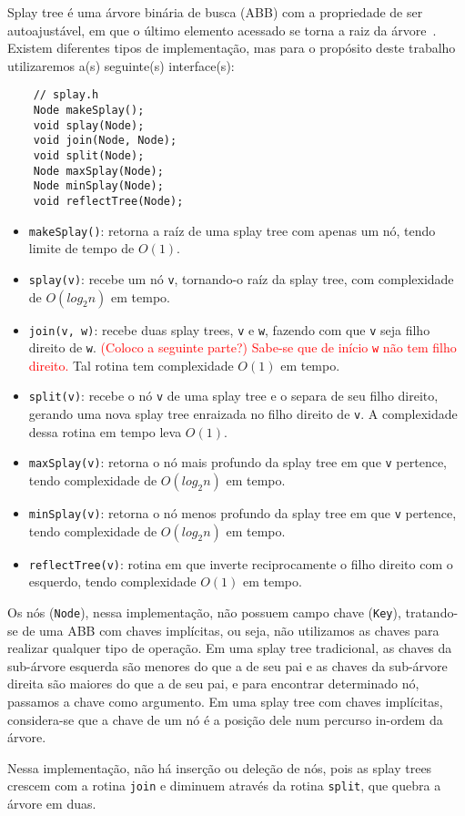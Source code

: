 Splay tree é uma árvore binária de busca (ABB) com a propriedade de ser autoajustável, em que o último elemento acessado se torna a raiz da árvore~\cite{SleatorT1985}. Existem diferentes tipos de implementação, mas para o propósito deste trabalho utilizaremos a(s) seguinte(s) interface(s):  

\begin{verbatim}
    // splay.h
    Node makeSplay();
    void splay(Node);
    void join(Node, Node);
    void split(Node);
    Node maxSplay(Node);
    Node minSplay(Node);
    void reflectTree(Node);
\end{verbatim}


\begin{itemize}
    \item \texttt{makeSplay()}: retorna a raíz de uma splay tree com apenas um nó, tendo limite de tempo de $O(1)$.  
    \item \texttt{splay(v)}: recebe um nó \texttt{v}, tornando-o raíz da splay tree, com complexidade de $O(log_2 n)$ em tempo.  
    \item \texttt{join(v, w)}: recebe duas splay trees, \texttt{v} e \texttt{w}, fazendo com que \texttt{v} seja filho direito de \texttt{w}.  \textcolor{red}{(Coloco a seguinte parte?) Sabe-se que de início \texttt{w} não tem filho direito.} Tal rotina tem complexidade $O(1)$ em tempo.  
    \item \texttt{split(v)}: recebe o nó \texttt{v} de uma splay tree e o separa de seu filho direito, gerando uma nova splay tree enraizada no filho direito de \texttt{v}. A complexidade dessa rotina em tempo leva $O(1)$.  
    \item \texttt{maxSplay(v)}: retorna o nó mais profundo da splay tree em que \texttt{v} pertence, tendo complexidade de $O(log_2 n)$ em tempo.  
    \item \texttt{minSplay(v)}: retorna o nó menos profundo da splay tree em que \texttt{v} pertence, tendo complexidade de $O(log_2 n)$ em tempo.  
    \item \texttt{reflectTree(v)}: rotina em que inverte reciprocamente o filho direito com o esquerdo, tendo complexidade $O(1)$ em tempo.  


\end{itemize}

Os nós (\texttt{Node}), nessa implementação, não possuem campo chave (\texttt{Key}), tratando-se de uma ABB com chaves implícitas, ou seja, não utilizamos as chaves para realizar qualquer tipo de operação. Em uma splay tree tradicional, as chaves da sub-árvore esquerda são menores do que a de seu pai e as chaves da sub-árvore direita são maiores do que a de seu pai, e para encontrar determinado nó, passamos a chave como argumento.  
Em uma splay tree com chaves implícitas, considera-se que a chave de um nó é a posição dele num percurso in-ordem da árvore.  

Nessa implementação, não há inserção ou deleção de nós, pois as splay trees crescem com a rotina \texttt{join} e diminuem através da rotina \texttt{split}, que quebra a árvore em duas.  

\newpage

